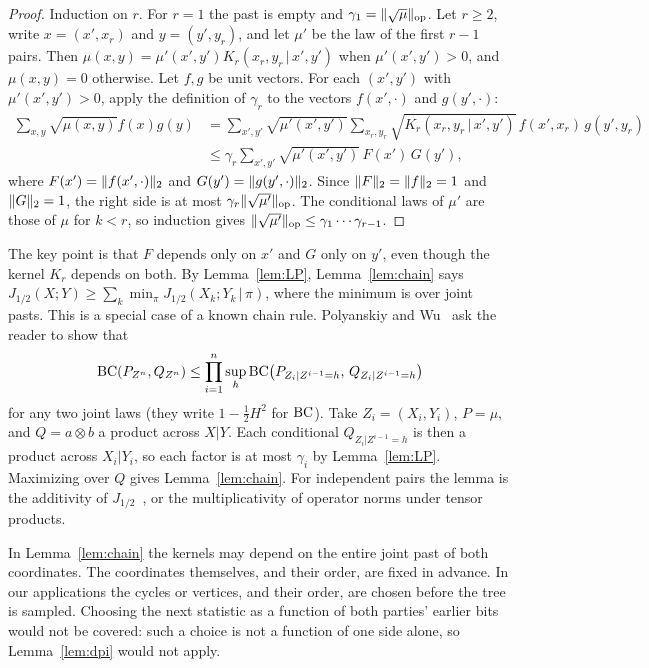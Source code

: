 \begin{proof}
Induction on $r$. For $r=1$ the past is empty and $\gamma_1=\lVert \sqrt\mu\rVert_{\mathrm{op}}$. Let $r\ge2$, write $x=(x',x_r)$ and $y=(y',y_r)$, and let $\mu'$ be the law of the first $r-1$ pairs. Then $\mu(x,y)=\mu'(x',y')K_r(x_r,y_r\,|\,x',y')$ when $\mu'(x',y')>0$, and $\mu(x,y)=0$ otherwise. Let $f,g$ be unit vectors. For each $(x',y')$ with $\mu'(x',y')>0$, apply the definition of $\gamma_r$ to the vectors $f(x',\cdot)$ and $g(y',\cdot)$:
\begin{align*}
  \sum_{x,y}\sqrt{\mu(x,y)}f(x)g(y)
  &=\sum_{x',y'}\sqrt{\mu'(x',y')}\sum_{x_r,y_r}\sqrt{K_r(x_r,y_r\,|\,x',y')}\,f(x',x_r)\,g(y',y_r)\\
  &\le\gamma_r\sum_{x',y'}\sqrt{\mu'(x',y')}\,F(x')\,G(y'),
\end{align*}
where $F(x')=\lVert f(x',\cdot)\rVert_2$ and $G(y')=\lVert g(y',\cdot)\rVert_2$. Since $\lVert F\rVert_2=\lVert f\rVert_2=1$ and $\lVert G\rVert_2=1$, the right side is at most $\gamma_r\lVert \sqrt{\mu'}\rVert_{\mathrm{op}}$. The conditional laws of $\mu'$ are those of $\mu$ for $k<r$, so induction gives $\lVert \sqrt{\mu'}\rVert_{\mathrm{op}}\le\gamma_1\cdots\gamma_{r-1}$.
\end{proof}

The key point is that $F$ depends only on $x'$ and $G$ only on $y'$, even though the kernel $K_r$ depends on both. By Lemma~\ref{lem:LP}, Lemma~\ref{lem:chain} says $J_{1/2}(X;Y)\ge\sum_k\min_\pi J_{1/2}(X_k;Y_k\,|\,\pi)$, where the minimum is over joint pasts. This is a special case of a known chain rule. Polyanskiy and Wu~\cite[Exercise~I.42(b)]{PolyanskiyWu25} ask the reader to show that
\[
  \mathrm{BC}(P_{Z^n},Q_{Z^n})\le\prod_{i=1}^n\sup_{h}\mathrm{BC}\bigl(P_{Z_i|Z^{i-1}=h},\,Q_{Z_i|Z^{i-1}=h}\bigr)
\]
for any two joint laws (they write $1-\frac12H^2$ for $\mathrm{BC}$). Take $Z_i=(X_i,Y_i)$, $P=\mu$, and $Q=a\otimes b$ a product across $X|Y$. Each conditional $Q_{Z_i|Z^{i-1}=h}$ is then a product across $X_i|Y_i$, so each factor is at most $\gamma_i$ by Lemma~\ref{lem:LP}. Maximizing over $Q$ gives Lemma~\ref{lem:chain}. For independent pairs the lemma is the additivity of $J_{1/2}$~\cite[Lemma~12]{LapidothPfister19}, or the multiplicativity of operator norms under tensor products.

\begin{remark}\label{rem:adaptive}
In Lemma~\ref{lem:chain} the kernels may depend on the entire joint past of both coordinates. The coordinates themselves, and their order, are fixed in advance. In our applications the cycles or vertices, and their order, are chosen before the tree is sampled. Choosing the next statistic as a function of both parties' earlier bits would not be covered: such a choice is not a function of one side alone, so Lemma~\ref{lem:dpi} would not apply.
\end{remark}

